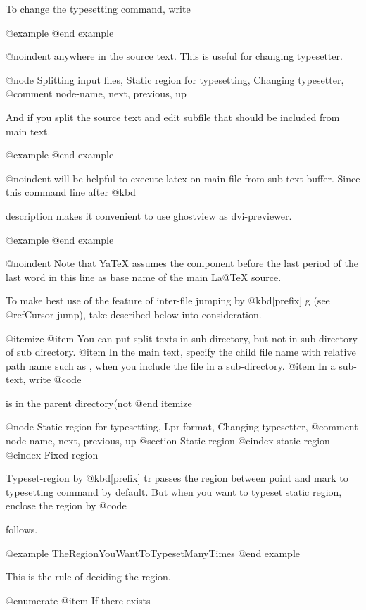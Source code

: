 {{  To change the typesetting command, write

@example
@end example

@noindent
anywhere in the source text.  This is useful for changing
typesetter.

@node Splitting input files, Static region for typesetting, Changing typesetter, %
@comment  node-name,  next,  previous,  up

  And if you split the source text and
edit subfile that should be included from main text.

@example
@end example

@noindent
will be helpful to execute latex on main file from sub text buffer.  Since
this command line after @kbd{%
description makes it convenient to use ghostview as dvi-previewer.

@example
@end example

@noindent
Note that YaTeX  assumes the component  before the  last period of
the last word in this line as base name of the main La@TeX{} source.

  To make best use of the feature of inter-file jumping by
@kbd{[prefix] g} (see @ref{Cursor jump}), take described below into
consideration.

@itemize
@item You can put split texts in sub directory, but not in
 sub directory of sub directory.
@item In the main text, specify the child file name with relative path name
 such as , when you include the file in
 a sub-directory.
@item In a sub-text, write @code{%
 is in the parent directory(not %
@end itemize

@node Static region for typesetting, Lpr format, Changing typesetter, %
@comment  node-name,  next,  previous,  up
@section Static region
@cindex static region
@cindex Fixed region

  Typeset-region by @kbd{[prefix] tr} passes the region between point and
mark to typesetting command by default.  But when you want to typeset
static region, enclose the region by @code{%
follows.

@example
          TheRegionYouWantToTypesetManyTimes
@end example

This is the rule of deciding the region.

@enumerate
@item
If there exists %

}}}}}

